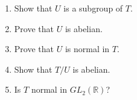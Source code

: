 {\begin{enumerate}
\begin{enumerate}
 \bf\item\rm 
Show that $U$ is a subgroup of $T$.
 
 \bf\item\rm 
Prove that $U$ is abelian.
 
 \bf\item\rm 
Prove that $U$ is normal in $T$.
 
 \bf\item\rm  
Show that $T/U$ is abelian.
 
 \bf\item\rm
Is $T$ normal in $GL_2( {\mathbb R})$?
 
\end{enumerate}
 
 
% 
% 
% 
% 
% 
% 
 
 
% 
% 
% 
% 
% 
 
 
 
 
 

\end{enumerate}}
